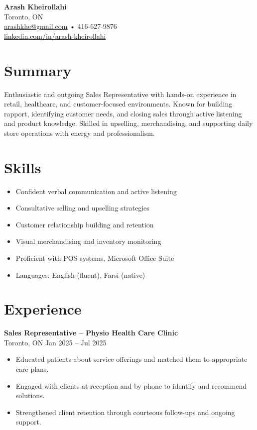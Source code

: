 \documentclass[letterpaper,11pt]{article}
\begin{document}

{\LARGE \textbf{Arash Kheirollahi}}\\[0.2em]
Toronto, ON \\
\href{mailto:arashkhe@gmail.com}{arashkhe@gmail.com} • 416-627-9876 \\
\href{https://linkedin.com/in/arash-kheirollahi}{linkedin.com/in/arash-kheirollahi} 

\vspace{0.8em}

\section*{Summary}
Enthusiastic and outgoing Sales Representative with hands-on experience in retail, healthcare, and customer-focused environments. Known for building rapport, identifying customer needs, and closing sales through active listening and product knowledge. Skilled in upselling, merchandising, and supporting daily store operations with energy and professionalism.

\section*{Skills}
\begin{itemize}[leftmargin=*]
  \item Confident verbal communication and active listening
  \item Consultative selling and upselling strategies
  \item Customer relationship building and retention
  \item Visual merchandising and inventory monitoring
  \item Proficient with POS systems, Microsoft Office Suite
  \item Languages: English (fluent), Farsi (native)
\end{itemize}

\section*{Experience}
\textbf{Sales Representative – Physio Health Care Clinic}\\
Toronto, ON \hfill Jan 2025 -- Jul 2025
\begin{itemize}[leftmargin=*]
  \item Educated patients about service offerings and matched them to appropriate care plans.
  \item Engaged with clients at reception and by phone to identify and recommend solutions.
  \item Strengthened client retention through courteous follow-ups and ongoing support.
\end{itemize}
\end{document}

